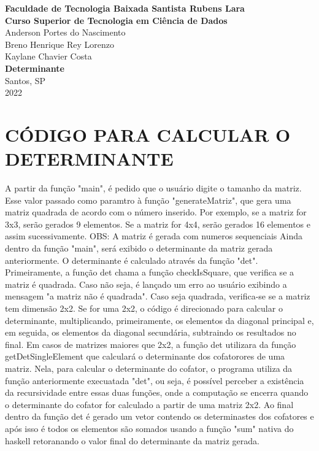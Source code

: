 \documentclass[a4paper, 12pt]{article}
\begin{document}
\begin{center}
    \large
    \textbf{Faculdade de Tecnologia Baixada Santista Rubens Lara\\}
    \textbf{Curso Superior de Tecnologia em Ciência de Dados}
    \vspace{6.5cm}\\
    Anderson Portes do Nascimento\\Breno Henrique Rey Lorenzo\\Kaylane Chavier Costa\\
    \vspace{6cm}
    \textbf{Determinante}
    \\
    \vspace{6cm}
    Santos, SP\\
    2022
\end{center}

\newpage
    \onehalfspacing
    \section{CÓDIGO PARA CALCULAR O DETERMINANTE}
    
    \par A partir da função "main", é pedido que o usuário digite o tamanho da matriz. Esse valor passado como paramtro à função "generateMatriz", que gera uma matriz quadrada de acordo com o número inserido. Por exemplo, se a matriz for 3x3, serão gerados 9 elementos. Se a matriz for 4x4, serão gerados 16 elementos e assim sucessivamente. OBS: A matriz é gerada com numeros sequenciais 
    Ainda dentro da função "main", será exibido o determinante da matriz gerada anteriormente. O determinante é calculado através da função "det". Primeiramente, a função det chama a função checkIsSquare, que verifica se a matriz é quadrada. Caso não seja, é lançado um erro ao  usuário exibindo a mensagem "a matriz não é quadrada". Caso seja quadrada, verifica-se se a matriz tem dimensão 2x2. Se for uma 2x2, o código é direcionado para calcular o determinante, multiplicando, primeiramente, os elementos da diagonal principal e, em seguida, os elementos da diagonal secundária, subtraindo os resultados no final.
    Em casos de matrizes  maiores que 2x2, a função det utilizara da função getDetSingleElement que calculará o determinante dos cofatorores de uma matriz. Nela, para calcular o determinante do cofator, o programa utiliza da função anteriormente execuatada "det", ou seja, é possível perceber a existência da recursividade entre essas duas funções, onde a computação se encerra quando o determinante do cofator for calculado a partir de uma matriz 2x2. Ao final dentro da função det é  gerado um vetor contendo os determinastes dos  cofatores e após isso é todos  os elementos são somados usando a função "sum" nativa do haskell retoranando o valor final do determinante da  matriz gerada.
\end{document}
